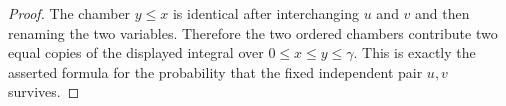 \begin{proof}
The chamber $y\le x$ is identical after interchanging $u$ and $v$ and then
renaming the two variables.  Therefore the two ordered chambers contribute two
equal copies of the displayed integral over $0\le x\le y\le\gamma$.  This is
exactly the asserted formula for the probability that the fixed independent
pair $u,v$ survives.
\end{proof}
